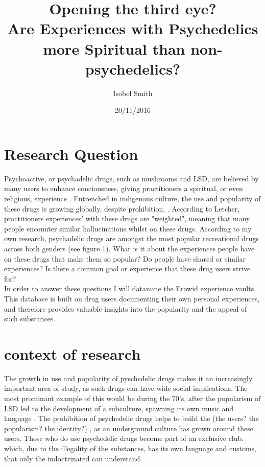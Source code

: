 \documentclass{article}
\title{Opening the third eye?  \\ Are Experiences with Psychedelics more Spiritual than non-psychedelics?}
\author{Isobel Smith}
\date{20/11/2016}
\begin{document}
\maketitle

\section{Research Question}

Psychoactive, or psychadelic drugs, such as mushrooms and LSD, are believed by many users to enhance conciousness, giving practitioners a spiritual, or even religious, experience \cite{letcher} \cite{watts}. Entrenched in indigenous culture, the use and popularity of these drugs is growing globally, despite prohibition, \cite{letcher} \cite{rager}. According to Letcher, practitioners experiences' with these drugs are "weighted", meaning that many people encounter similar hallucinations whilst on these drugs.  According to my own research, psychadelic drugs are amongst the most popular recreational drugs across both genders (see figure 1). What is it about the experiences people have on these drugs that make them so popular? Do people have shared or similar experiences? Is there a common goal or experience that these drug users strive for?\\

In order to answer these questions I will datamine the Erowid experience vaults. This database is built on drug users documenting their own personal experiences, and therefore provides valuable insights into the popularity and the appeal of such substances. 


\section{context of research}
The growth in use and popularity of pyschedelic drugs makes it an increasingly important area of study, as such drugs can have wide social implications. The most prominant example of this would be during the 70's, after the popularism of LSD led to the development of a subculture, spawning its own music and language \cite{letcher}. The prohibition of psychedelic drugs helps to build the (the users? the popularism? the identity?) , as an underground culture has grown around these users. Those who do use psychedelic drugs become part of an exclusive club. which, due to the illegality of the substances, has its own language and customs, that only the indoctrinated can understand. \\
\end{document}
